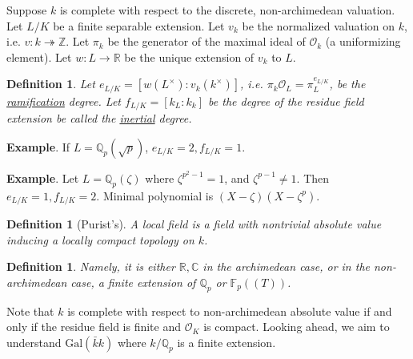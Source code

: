 \documentclass[letterpaper, 12pt]{article}
\newtheorem{definition}[thm]{Definition}
\newcommand{\roi}[1]{\mathcal{O}_{#1}}
\newcommand{\gal}[3]{\mathrm{Gal}(#1 #2 #3)}
\newcommand{\reals}{\mathbb{R}}
\newcommand{\cmplx}{\mathbb{C}}
\newcommand{\Q}{\mathbb{Q}}
\newcommand{\Qp}{\Q_p}
\begin{document}
Suppose $k$ is complete with respect to the discrete, non-archimedean valuation. Let $L/K$ be a finite separable extension. Let $v_k$ be the normalized valuation on $k$, i.e. $v: k \twoheadrightarrow \mathbb{Z}$. Let $\pi_k$ be the generator of the maximal ideal of $\roi k$ (a uniformizing element). Let $w : L \rightarrow \reals$ be the unique extension of $v_k$ to $L$.

\begin{definition}
  Let $e_{L/K} = [ w(L^\times) : v_k(k^\times)]$, i.e. $\pi_k \roi L = \pi_L^{e_{L/K}}$, be the \uline{ramification} degree. Let $f_{L/K} = [k_L : k_k]$ be the degree of the residue field extension be called the \uline{inertial} degree.
\end{definition}

\textbf{Example}. If $L = \Qp(\sqrt{p})$, $e_{L/K} = 2, f_{L/K} = 1$.

\textbf{Example}. Let $L = \Qp(\zeta)$ where $\zeta^{p^2 - 1} = 1$, and $\zeta^{p - 1} \neq 1$. Then $e_{L/K} = 1, f_{L/K} = 2$. Minimal polynomial is $(X - \zeta)(X - \zeta^p)$.

\begin{definition}[Purist's]
A local field is a field with nontrivial absolute value inducing a locally compact topology on $k$.
\end{definition}

\begin{definition}
Namely, it is either $\reals, \cmplx$ in the archimedean case, or in the non-archimedean case, a finite extension of $\Qp$ or $\mathbb{F}_p((T))$.
\end{definition}

Note that $k$ is complete with respect to non-archimedean absolute value if and only if the residue field is finite and $\roi K$ is compact. Looking ahead, we aim to understand $\gal \bar{k} k$ where $k/\Qp$ is a finite extension.
\end{document}
